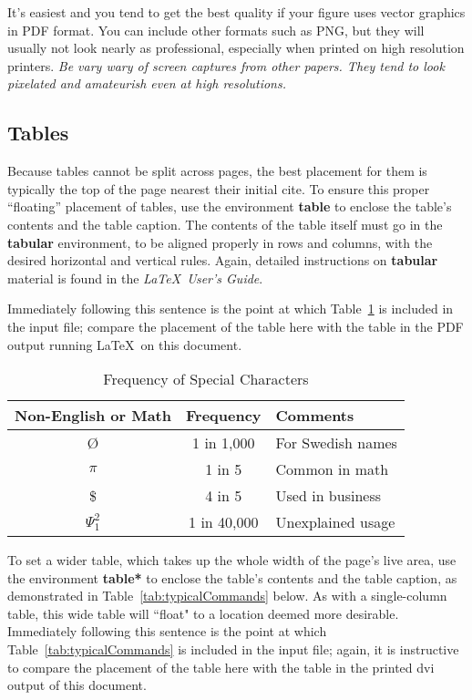 \documentclass{sig-alternate}
\begin{document}
It's easiest and you tend to get the best quality if your figure uses vector graphics
in PDF format. You can include other formats such as PNG, but they will usually
not look nearly as professional, especially when printed on high resolution printers.
\emph{Be vary wary of screen captures from other papers. They tend to look pixelated
and amateurish even at high resolutions.}

\subsection{Tables}
\label{sec:tables}

Because tables cannot be split across pages, the best
placement for them is typically the top of the page
nearest their initial cite.  To
ensure this proper ``floating'' placement of tables, use the
environment \textbf{table} to enclose the table's contents and
the table caption.  The contents of the table itself must go
in the \textbf{tabular} environment, to
be aligned properly in rows and columns, with the desired
horizontal and vertical rules.  Again, detailed instructions
on \textbf{tabular} material
is found in the \textit{\LaTeX\ User's Guide}.

Immediately following this sentence is the point at which
Table~\ref{tab:frequencyOfSpecialChars} is included in the input file; 
compare the placement of the table here with the table in the
PDF output running \LaTeX\ on this document.

\begin{table}[t]
\centering
\caption{Frequency of Special Characters}
\label{tab:frequencyOfSpecialChars}
\begin{tabular}{c|c|l}
Non-English or Math&Frequency & Comments\\ \hline
\O & 1 in 1,000 & For Swedish names\\
$\pi$ & 1 in 5 & Common in math\\
\$ & 4 in 5 & Used in business\\
$\Psi^2_1$ & 1 in 40,000 & Unexplained usage\\
\end{tabular}
\end{table}

To set a wider table, which takes up the whole width of
the page's live area, use the environment
\textbf{table*} to enclose the table's contents and
the table caption, as demonstrated in Table~\ref{tab:typicalCommands} below.  
As with a single-column table, this wide
table will ``float" to a location deemed more desirable.
Immediately following this sentence is the point at which
Table~\ref{tab:typicalCommands} is included in the input file; again, it is
instructive to compare the placement of the
table here with the table in the printed dvi
output of this document.
\end{document}
